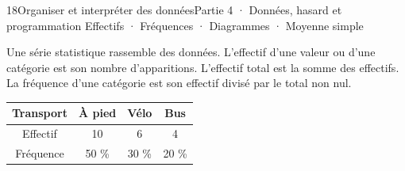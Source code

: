 \begin{ouverture}[statistiques]{18}{Organiser et interpréter des données}{Partie 4 · Données, hasard et programmation}
{Effectifs · Fréquences · Diagrammes · Moyenne simple}
\end{ouverture}
\pagestyle{otMain}\essentiel\fontsize{11}{15}\selectfont
{}\label{cours-18-1}
\begin{definition}Une série statistique rassemble des données. L’effectif d’une valeur ou d’une catégorie est son nombre d’apparitions. L’effectif total est la somme des effectifs. La fréquence d’une catégorie est son effectif divisé par le total non nul.\end{definition}
\begin{center}\renewcommand{\arraystretch}{1.35}\begin{tabular}{c|ccc}\toprule
Transport & À pied & Vélo & Bus\\\midrule
Effectif & 10 & 6 & 4\\
Fréquence & 50 \% & 30 \% & 20 \%\\
\bottomrule\end{tabular}\end{center}
\label{fig-cours-18-1-cours-statistiques}

